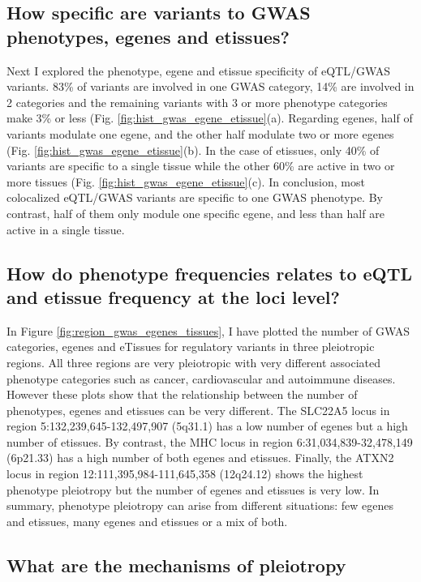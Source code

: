 \subsection*{How specific are variants to GWAS phenotypes, egenes and etissues?}

Next I explored the phenotype, egene and etissue specificity of eQTL/GWAS variants.
%
83\% of variants are involved in one GWAS category, 14\% are involved in 2 categories and the remaining variants with 3 or more phenotype categories make 3\% or less (Fig. \ref{fig:hist_gwas_egene_etissue}(a).
%
Regarding egenes, half of variants modulate one egene, and the other half modulate two or more egenes (Fig. \ref{fig:hist_gwas_egene_etissue}(b).
%
In the case of etissues, only 40\% of variants are specific to a single tissue while the other 60\% are active in two or more tissues (Fig. \ref{fig:hist_gwas_egene_etissue}(c).
%
In conclusion, most colocalized eQTL/GWAS variants are specific to one GWAS phenotype. By contrast, half of them only module one specific egene, and less than half are active in a single tissue.

\subsection*{How do phenotype frequencies relates to eQTL and etissue frequency at the loci level?}

In Figure \ref{fig:region_gwas_egenes_tissues}, I have plotted the number of GWAS categories, egenes and eTissues for regulatory variants in three pleiotropic regions.
%
All three regions are very pleiotropic with very different associated phenotype categories such as cancer, cardiovascular and autoimmune diseases.
%
However these plots show that the relationship between the number of phenotypes, egenes and etissues can be very different.
%
The SLC22A5 locus in region 5:132,239,645-132,497,907 (5q31.1) has a low number of egenes but a high number of etissues.
%
By contrast, the MHC locus in region 6:31,034,839-32,478,149 (6p21.33) has a high number of both egenes and etissues.
%
Finally, the ATXN2 locus in region 12:111,395,984-111,645,358 (12q24.12) shows the highest phenotype pleiotropy but the number of egenes and etissues is very low.
%
In summary, phenotype pleiotropy can arise from different situations: few egenes and etissues, many egenes and etissues or a mix of both.

\subsection*{What are the mechanisms of pleiotropy}

